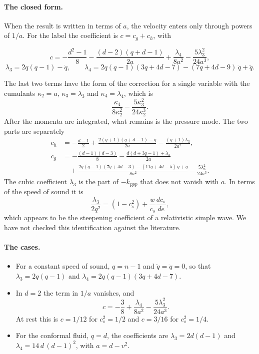 \documentclass[11pt,aps,preprint,nofootinbib,superscriptaddress,tightenlines]{revtex4-2}
\def\st{\begin{equation}}
\def\stp{\end{equation}}
\let\oldparagraph\paragraph
\renewcommand{\paragraph}{\par\bigskip\oldparagraph}
\begin{document}
\paragraph{The closed form.}  When the result is written in terms of $a$, the velocity enters only through powers of $1/a$.  For the label the
coefficient is $c=c_g+c_h$, with
\begin{keyeq}
\st
c=-\frac{d^2-1}8-\frac{(d-2)(q+d-1)}{2a}+\frac{\lambda_4}{8a^2}-\frac{5\lambda_3^2}{24a^3},
\label{c}
\stp
\st
\lambda_3=2q(q-1)-\dot q,\qquad \lambda_4=2q(q-1)(3q+4d-7)-(7q+4d-9)\,\dot q+\ddot q .
\stp
\end{keyeq}
The last two terms have the form of the correction for a single variable with the cumulants $\kappa_2=a$, $\kappa_3=\lambda_3$ and
$\kappa_4=\lambda_4$, which is
\st
\frac{\kappa_4}{8\kappa_2^2}-\frac{5\kappa_3^2}{24\kappa_2^3} .
\stp  After the momenta are integrated, what remains is the pressure mode.  The two parts are separately
\begin{align}
c_h&=-\frac{d-1}2+\frac{2(q+1)(q+d-1)-\dot q}{2a}-\frac{(q+1)\lambda_3}{2a^2}, \nonumber\\
c_g&=-\frac{(d-1)(d-3)}8-\frac{d(d+3q-1)+\lambda_3}{2a} \nonumber\\
&\quad+\frac{2q(q-1)(7q+4d-3)-(11q+4d-5)\,\dot q+\ddot q}{8a^2}-\frac{5\lambda_3^2}{24a^3} .
\end{align}
The cubic coefficient $\lambda_3$ is the part of $-k_{ppp}$ that does not vanish with $a$.  In terms of the speed of sound it is
\st
\frac{\lambda_3}{2q^2}=(1-c_s^2)+\frac w{c_s}\frac{dc_s}{de} ,
\stp
which appears to be the steepening coefficient of a relativistic simple wave.  We have not checked this
identification against the literature.

\paragraph{The cases.}
\begin{itemize}
\item For a constant speed of sound, $q=n-1$ and $\dot q=\ddot q=0$, so that $\lambda_3=2q(q-1)$ and $\lambda_4=2q(q-1)(3q+4d-7)$.
\item In $d=2$ the term in $1/a$ vanishes, and
  \st
  c=-\frac38+\frac{\lambda_4}{8a^2}-\frac{5\lambda_3^2}{24a^3} .
  \stp
  At rest this is $c=1/12$ for $c_s^2=1/2$ and $c=3/16$ for $c_s^2=1/4$.
\item For the conformal fluid, $q=d$, the coefficients are $\lambda_3=2d(d-1)$ and $\lambda_4=14\,d\,(d-1)^2$, with $a=d-v^2$.
\end{itemize}
\end{document}
